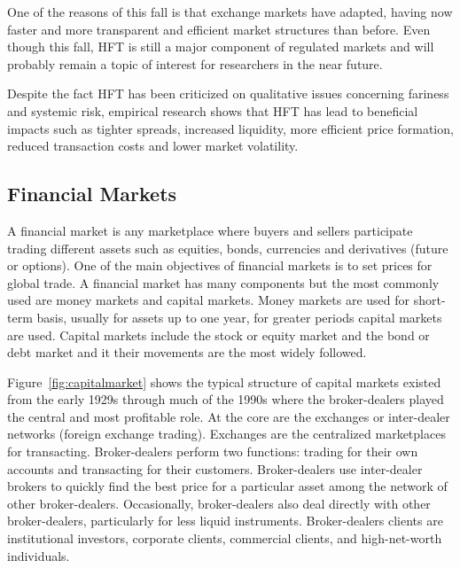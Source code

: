 One of the reasons of this fall is that exchange markets have adapted, having
now faster and more transparent and efficient market structures than before.
Even though this fall, HFT is still a major component of regulated markets and
will probably remain a topic of interest for researchers in the near future.

Despite the fact HFT has been criticized on qualitative issues concerning fariness and
systemic risk, empirical research shows that HFT has lead to beneficial impacts
such as tighter spreads, increased liquidity, more efficient price formation,
reduced transaction costs and lower market volatility.


\subsection{Financial Markets}

A financial market is any marketplace where buyers and sellers participate
trading different assets such as equities, bonds, currencies and derivatives
(future or options). One of the main objectives of financial markets is to set
prices for global trade.
A financial market has many components but the most commonly used are money
markets and capital markets. Money markets are used for short-term basis,
usually for assets up to one year, for greater periods capital markets are used.
Capital markets include the stock or equity market and the bond or debt market
and it their movements are the most widely followed.

Figure~\ref{fig:capitalmarket} shows the typical structure of capital markets
existed from the early 1929s through much of the 1990s where the broker-dealers
played the central and most profitable role.  At the core are the exchanges or
inter-dealer networks (foreign exchange trading). Exchanges are the centralized
marketplaces for transacting.  Broker-dealers perform two functions: trading for
their own accounts and transacting for their customers. Broker-dealers use
inter-dealer brokers to quickly find the best price for a particular asset among
the network of other broker-dealers. Occasionally, broker-dealers also deal
directly with other broker-dealers, particularly for less liquid instruments.
Broker-dealers clients are institutional investors, corporate clients,
commercial clients, and high-net-worth individuals.


